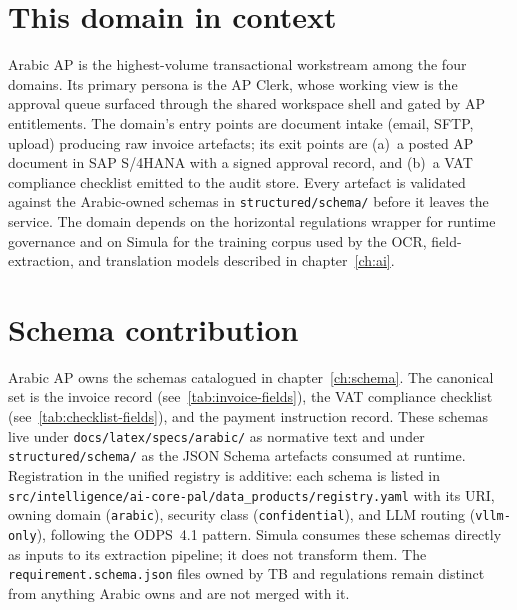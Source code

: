 \section{This domain in context}
\label{sec:agent-domain-context}
Arabic AP is the highest-volume transactional workstream among the
four domains. Its primary persona is the AP Clerk, whose working view
is the approval queue surfaced through the shared workspace shell and
gated by AP entitlements. The domain's entry points are document
intake (email, SFTP, upload) producing raw invoice artefacts; its
exit points are (a)~a posted AP document in SAP S/4HANA with a signed
approval record, and (b)~a VAT compliance checklist emitted to the
audit store. Every artefact is validated against the Arabic-owned
schemas in \texttt{structured/schema/} before it leaves the service.
The domain depends on the horizontal regulations wrapper for runtime
governance and on Simula for the training corpus used by the OCR,
field-extraction, and translation models described in
chapter~\ref{ch:ai}.

\section{Schema contribution}
\label{sec:agent-schema-contrib}
Arabic AP owns the schemas catalogued in chapter~\ref{ch:schema}. The
canonical set is the invoice record (see~\ref{tab:invoice-fields}),
the VAT compliance checklist (see~\ref{tab:checklist-fields}), and the
payment instruction record. These schemas live under
\texttt{docs/latex/specs/arabic/} as normative text and under
\texttt{structured/schema/} as the JSON Schema artefacts consumed at
runtime. Registration in the unified registry is additive: each
schema is listed in
\texttt{src/intelligence/ai-core-pal/data\_products/registry.yaml}
with its URI, owning domain (\texttt{arabic}), security class
(\texttt{confidential}), and LLM routing
(\texttt{vllm-only}), following the ODPS~4.1 pattern. Simula consumes
these schemas directly as inputs to its extraction pipeline; it does
not transform them. The \texttt{requirement.schema.json} files owned
by TB and regulations remain distinct from anything Arabic owns and
are not merged with it.

